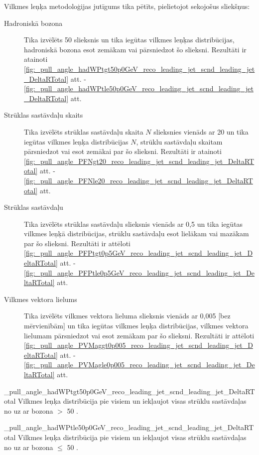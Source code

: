 Vilkmes leņķa metodoloģijas jutīgums tika pētīts, pielietojot sekojošus \gls{sliekšņus}:
\begin{description}
\item[Hadroniskā \PW bozona \pt] Tika izvēlēts 50 \GeV slieksnis un tika iegūtas vilkmes leņķas distribūcijas, hadroniskā \PW bozona \pt esot zemākam vai pārsniedzot šo slieksni. Rezultāti ir atainoti \ref{fig:_pull_angle_hadWPtgt50p0GeV_reco_leading_jet_scnd_leading_jet_DeltaRTotal} att. - \ref{fig:_pull_angle_hadWPtle50p0GeV_reco_leading_jet_scnd_leading_jet_DeltaRTotal} att.

\item[Strūklas sastāvdaļu skaits] Tika izvēlēts strūklas sastāvdaļu skaita $N$ slieksnies vienāds ar 20 un tika iegūtas vilkmes leņķa distribūcijas $N$, strūklu sastāvdaļu skaitam pārsniedzot vai esot zemākai par šo slieksni. Rezultāti ir atainoti \ref{fig:_pull_angle_PFNgt20_reco_leading_jet_scnd_leading_jet_DeltaRTotal} att. - \ref{fig:_pull_angle_PFNle20_reco_leading_jet_scnd_leading_jet_DeltaRTotal} att.
                                        
\item[Strūklas sastāvdaļu \pt] Tika izvēlēts strūklas sastāvdaļu \pt slieksnis vienāds ar 0,5 \GeV un tika iegūtas vilkmes leņķā distribūcijas, strūklu sastāvdaļu \pt esot lielākam vai mazākam par šo slieksni. Rezultāti ir attēloti \ref{fig:_pull_angle_PFPtgt0p5GeV_reco_leading_jet_scnd_leading_jet_DeltaRTotal} att. - \ref{fig:_pull_angle_PFPtle0p5GeV_reco_leading_jet_scnd_leading_jet_DeltaRTotal} att.

\item[Vilkmes vektora lielums]  Tika izvēlēts vilkmes vektora lieluma slieksnis vienāds ar 0,005 [bez mērvienībām] un tika iegūtas vilkmes leņķa distribūcijas, vilkmes vektora lielumam pārsniedzot vai esot zemākam par šo slieksni. Rezultāti ir attēloti \ref{fig:_pull_angle_PVMaggt0p005_reco_leading_jet_scnd_leading_jet_DeltaRTotal} att. - \ref{fig:_pull_angle_PVMagle0p005_reco_leading_jet_scnd_leading_jet_DeltaRTotal} att.
\end{description}

          {_pull_angle_hadWPtgt50p0GeV_reco_leading_jet_scnd_leading_jet_DeltaRTotal}
          {Vilkmes leņķa distribūcija pie visiem \DeltaR un iekļaujot visas strūklu sastāvdaļas no \leadingjet uz \scndleadingjet ar \PW bozona \pt $>$ 50 \GeV.}

          {_pull_angle_hadWPtle50p0GeV_reco_leading_jet_scnd_leading_jet_DeltaRTotal}
          {Vilkmes leņķa distribūcija pie visiem \DeltaR un iekļaujot visas strūklu sastāvdaļas no \leadingjet uz \scndleadingjet ar \PW bozona \pt $\leq$ 50 \GeV.}
          

